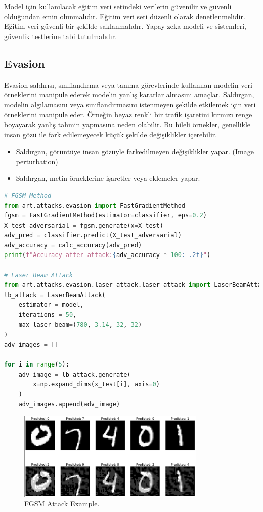 Model için kullanılacak eğitim veri setindeki verilerin güvenilir ve güvenli olduğundan emin olunmalıdır. Eğitim veri seti düzenli olarak denetlenmelidir. Eğitim veri güvenli bir şekilde saklanmalıdır. Yapay zeka modeli ve sistemleri, güvenlik testlerine tabi tutulmalıdır. 

\subsection{Evasion}
Evasion saldırısı, sınıflandırma veya tanıma görevlerinde kullanılan modelin veri örneklerini manipüle ederek modelin yanlış kararlar almasını amaçlar. Saldırgan, modelin algılamasını veya sınıflandırmasını istenmeyen şekilde etkilemek için veri örneklerini manipüle eder. Örneğin beyaz renkli bir trafik işaretini kırmızı renge boyayarak yanlış tahmin yapmasına neden olabilir. Bu hileli örnekler, genellikle insan gözü ile fark edilemeyecek küçük şekilde değişiklikler içerebilir.
\begin{itemize}
    \item Saldırgan, görüntüye insan gözüyle farkedilmeyen değişiklikler yapar. (Image perturbation)
    \item Saldırgan, metin örneklerine işaretler veya eklemeler yapar.
\end{itemize}

\begin{lstlisting}[language=Python]
# FGSM Method
from art.attacks.evasion import FastGradientMethod
fgsm = FastGradientMethod(estimator=classifier, eps=0.2)
X_test_adversarial = fgsm.generate(x=X_test)
adv_pred = classifier.predict(X_test_adversarial)
adv_accuracy = calc_accuracy(adv_pred)
print(f"Accuracy after attack:{adv_accuracy * 100: .2f}")

# Laser Beam Attack
from art.attacks.evasion.laser_attack.laser_attack import LaserBeamAttack
lb_attack = LaserBeamAttack(
    estimator = model,
    iterations = 50,
    max_laser_beam=(780, 3.14, 32, 32)
)
adv_images = []

for i in range(5):
    adv_image = lb_attack.generate(
        x=np.expand_dims(x_test[i], axis=0)
    )
    adv_images.append(adv_image)
\end{lstlisting}

\begin{figure}[h]
  \centering
  \includegraphics[width=0.8\textwidth]{images/evasion_fgsm.png}
  \caption{FGSM Attack Example.}
\end{figure}

